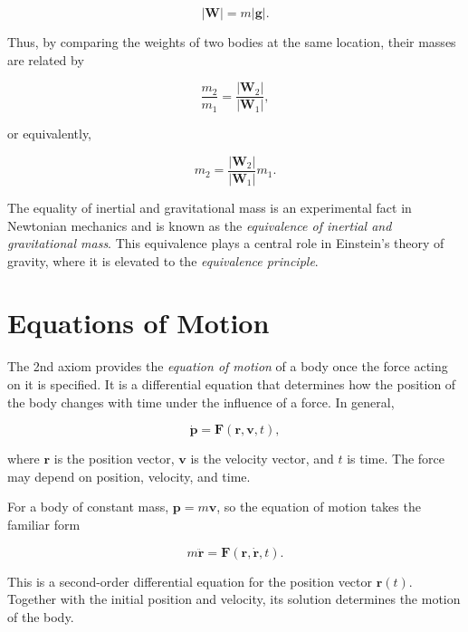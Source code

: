 \documentclass[12pt]{article}
\begin{document}
\begin{equation}
|\mathbf{W}| = m|\mathbf{g}|.
\end{equation}

Thus, by comparing the weights of two bodies at the same location, their masses are related by

\begin{equation}
\frac{m_2}{m_1}
= \frac{|\mathbf{W}_2|}{|\mathbf{W}_1|},
\end{equation}

or equivalently,

\begin{equation}
m_2 = \frac{|\mathbf{W}_2|}{|\mathbf{W}_1|}m_1.
\end{equation}

The equality of inertial and gravitational mass is an experimental fact in Newtonian mechanics and is known as the \emph{equivalence of inertial and gravitational mass}. This equivalence plays a central role in Einstein's theory of gravity, where it is elevated to the \emph{equivalence principle}.


\section{Equations of Motion}

The 2nd axiom provides the \emph{equation of motion} of a body once the
force acting on it is specified. It is a differential equation that
determines how the position of the body changes with time under the
influence of a force. In general,

\begin{equation}
\dot{\mathbf{p}} = \mathbf{F}(\mathbf{r},\mathbf{v},t),
\end{equation}

where $\mathbf{r}$ is the position vector, $\mathbf{v}$ is the velocity
vector, and $t$ is time. The force may depend on position, velocity,
and time.

For a body of constant mass, $\mathbf{p}=m\mathbf{v}$, so the equation
of motion takes the familiar form

\begin{equation}
m\ddot{\mathbf{r}}
= \mathbf{F}(\mathbf{r},\dot{\mathbf{r}},t).
\end{equation}

This is a second-order differential equation for the position vector
$\mathbf{r}(t)$. Together with the initial position and velocity, its
solution determines the motion of the body.
\end{document}
